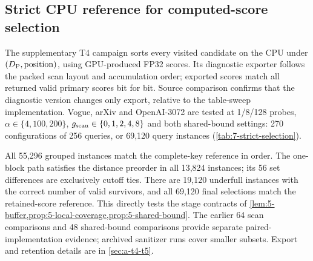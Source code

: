 \subsection{Strict CPU reference for computed-score selection}
\label{sec:7-strict-selection}

The supplementary T4 campaign sorts every visited candidate on the CPU
under $(D_{\mathrm{P}},\mathrm{position})$, using GPU-produced FP32 scores.
Its diagnostic exporter follows the packed scan layout and accumulation
order; exported scores match all returned valid primary scores bit for
bit. Source comparison confirms that the diagnostic version changes only
export, relative to the table-sweep implementation.
Vogue, arXiv and OpenAI-3072 are tested at 1/8/128 probes,
$\alpha\in\{4,100,200\}$, $g_{\mathrm{scan}}\in\{0,1,2,4,8\}$ and both shared-bound
settings: 270 configurations of 256 queries, or 69,120 query instances
(\cref{tab:7-strict-selection}).

\suppressfloats[t]
\begin{table}[htbp]
\centering
\caption[Strict computed-score selection checks]{T4 CPU-reference checks.
Set and order equality use the complete primary key. Valid count checks
$\min(c,n_c)$ survivors; final equality sorts retained computed refined
scores by $(\refineddist,\mathrm{ID})$, including their FP32 bits. Counts
are query instances, with queries reused across configurations.}
\label{tab:7-strict-selection}
\footnotesize\setlength{\tabcolsep}{3pt}

\end{table}

All 55,296 grouped instances match the complete-key reference in order.
The one-block path satisfies the distance preorder in all 13,824 instances;
its 56 set differences are exclusively cutoff ties. There are 19,120
underfull instances with the correct number of valid survivors, and all
69,120 final selections match the retained-score reference.
This directly tests the stage contracts of
\cref{lem:5-buffer,prop:5-local-coverage,prop:5-shared-bound}.
The earlier 64 scan comparisons and 48 shared-bound comparisons provide
separate paired-implementation evidence; archived sanitizer runs cover
smaller subsets. Export and retention details are in \cref{sec:a-t4-t5}.
